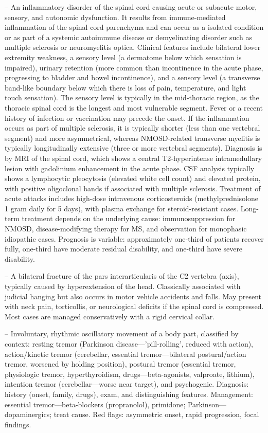 -- An inflammatory disorder of the spinal cord causing acute or subacute motor, sensory, and autonomic dysfunction. It results from immune-mediated inflammation of the spinal cord parenchyma and can occur as a isolated condition or as part of a systemic autoimmune disease or demyelinating disorder such as multiple sclerosis or neuromyelitis optica. Clinical features include bilateral lower extremity weakness, a sensory level (a dermatome below which sensation is impaired), urinary retention (more common than incontinence in the acute phase, progressing to bladder and bowel incontinence), and a sensory level (a transverse band-like boundary below which there is loss of pain, temperature, and light touch sensation). The sensory level is typically in the mid-thoracic region, as the thoracic spinal cord is the longest and most vulnerable segment. Fever or a recent history of infection or vaccination may precede the onset. If the inflammation occurs as part of multiple sclerosis, it is typically shorter (less than one vertebral segment) and more asymmetrical, whereas NMOSD-related transverse myelitis is typically longitudinally extensive (three or more vertebral segments). Diagnosis is by MRI of the spinal cord, which shows a central T2-hyperintense intramedullary lesion with gadolinium enhancement in the acute phase. CSF analysis typically shows a lymphocytic pleocytosis (elevated white cell count) and elevated protein, with positive oligoclonal bands if associated with multiple sclerosis. Treatment of acute attacks includes high-dose intravenous corticosteroids (methylprednisolone 1 gram daily for 5 days), with plasma exchange for steroid-resistant cases. Long-term treatment depends on the underlying cause: immunosuppression for NMOSD, disease-modifying therapy for MS, and observation for monophasic idiopathic cases. Prognosis is variable: approximately one-third of patients recover fully, one-third have moderate residual disability, and one-third have severe disability.

-- A bilateral fracture of the pars interarticularis of the C2 vertebra (axis), typically caused by hyperextension of the head. Classically associated with judicial hanging but also occurs in motor vehicle accidents and falls. May present with neck pain, torticollis, or neurological deficits if the spinal cord is compressed. Most cases are managed conservatively with a rigid cervical collar.

-- Involuntary, rhythmic oscillatory movement of a body part, classified by context: resting tremor (Parkinson disease—'pill-rolling', reduced with action), action/kinetic tremor (cerebellar, essential tremor—bilateral postural/action tremor, worsened by holding position), postural tremor (essential tremor, physiologic tremor, hyperthyroidism, drugs—beta-agonists, valproate, lithium), intention tremor (cerebellar—worse near target), and psychogenic. Diagnosis: history (onset, family, drugs), exam, and distinguishing features. Management: essential tremor—beta-blockers (propranolol), primidone; Parkinson—dopaminergics; treat cause. Red flags: asymmetric onset, rapid progression, focal findings.

